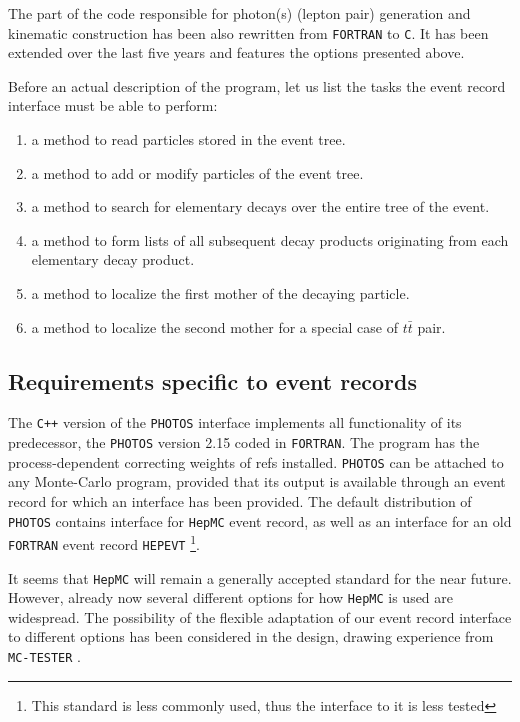 \documentclass[]{Photos_interface_design}
\begin{document}
The part of the code responsible for photon(s) (lepton pair) 
generation and kinematic 
construction has been also rewritten from {\tt FORTRAN} to {\tt C}. It has been extended
over the last five years and features the options presented above.


Before an actual description of the program, let us list the tasks the event record interface must be able to perform:
\begin{enumerate}
\item a method to read  particles stored in the event tree.
\item a method to add or modify particles of the event tree.
\item a method to search for elementary decays over the entire tree of the event.
\item a method to form lists of all subsequent decay products originating from each elementary decay product.
\item a method to localize the first mother of the decaying particle. 
\item a method to localize the second mother for a special case of $t \bar t$ pair.
\end{enumerate}


\subsection{ Requirements specific to event records}

The {\tt C++} version of the {\tt PHOTOS} interface implements all functionality
of its predecessor, the {\tt PHOTOS} version 2.15 \cite{Golonka:2005pn} coded in {\tt FORTRAN}.
The program has the process-dependent correcting weights of refs 
\cite{Golonka:2006tw,Nanava:2009vg} installed.
{\tt PHOTOS} can be attached to any Monte-Carlo program,
provided that its output is available through an event record for which an interface has been provided.
The default distribution of {\tt PHOTOS} contains interface for {\tt HepMC} \cite{Dobbs:2001ck} event record,
as well as an interface for an old {\tt FORTRAN} event record {\tt HEPEVT}%
\footnote{This standard is less commonly used, thus the interface to it is less tested}.

It seems that {\tt HepMC} will
remain a generally accepted standard for the near future. However,
already now several different options for how {\tt HepMC} is used are
widespread. The possibility of the flexible  adaptation of our event record 
interface to different
options has been considered in the design,  drawing experience
from {\tt MC-TESTER} \cite{Davidson:2008ma,Golonka:2002rz}.
\end{document}
